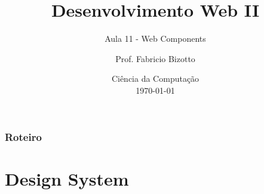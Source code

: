 \documentclass[
	9pt, %
	t, %
]{beamer}
\title[DesWebII]{Desenvolvimento Web II} %
\subtitle{Aula 11 - Web Components} %
\author[Fabricio Bizotto]{Prof. Fabricio Bizotto} %
\institute[IFC]{Instituto Federal Catarinense \\ \smallskip \textit{fabricio.bizotto@ifc.edu.br}} %
\date[\today]{Ciência da Computação \\ \today} %
\begin{document}

\begin{frame}
	\titlepage %
\end{frame}


\begin{frame}
	\frametitle{Roteiro} %
	
	\tableofcontents %
\end{frame}


\section{Design System}
\end{document}
